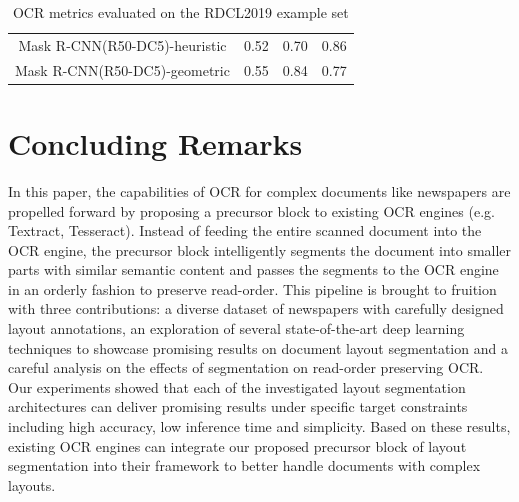 \documentclass[letterpaper]{article} %
\begin{document}
\begin{table}[h]
\begin{tabular}{c|ccc}

Mask R-CNN(R50-DC5)-heuristic & 0.52 & 0.70 & 0.86 \\

Mask R-CNN(R50-DC5)-geometric & 0.55 & 0.84 & 0.77 \\

\bottomrule
\end{tabular}
\caption{OCR metrics evaluated on the RDCL2019 example set }
\label{table:ocrmetric}
\end{table}

\section{Concluding Remarks}
In this paper, the capabilities of OCR for complex documents like newspapers are propelled forward by proposing a precursor block to existing OCR engines (e.g. Textract, Tesseract). Instead of feeding the entire scanned document into the OCR engine, the precursor block intelligently segments the document into smaller parts with similar semantic content and passes the segments to the OCR engine in an orderly fashion to preserve read-order. This pipeline is brought to fruition with three contributions: a diverse dataset of newspapers with carefully designed layout annotations, an exploration of several state-of-the-art deep learning techniques to showcase promising results on document layout segmentation and a careful analysis on the effects of segmentation on read-order preserving OCR. Our experiments showed that each of the investigated layout segmentation architectures can deliver promising results under specific target constraints including high accuracy, low inference time and simplicity. Based on these results, existing OCR engines can integrate our proposed precursor block of layout segmentation into their framework to better handle documents with complex layouts.
\end{document}
